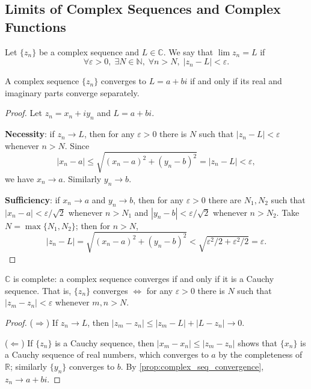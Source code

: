 \subsection{Limits of Complex Sequences and Complex Functions}

\begin{definition}\label{def:complex_seq_limit}
Let $\{z_n\}$ be a complex sequence and $L \in \mathbb{C}$. We say that $\lim z_n = L$ if
\[
\forall \varepsilon > 0,\; \exists N \in \mathbb{N},\; \forall n > N,\; |z_n - L| < \varepsilon.
\]
\end{definition}

\begin{proposition}\label{prop:complex_seq_convergence}
A complex sequence $\{z_n\}$ converges to $L = a+bi$ if and only if its real and imaginary parts converge separately.
\end{proposition}

\begin{proof}
Let $z_n = x_n + iy_n$ and $L = a + bi$.

\textbf{Necessity}: if $z_n \to L$, then for any $\varepsilon > 0$ there is $N$ such that $|z_n - L| < \varepsilon$ whenever $n > N$. Since
\[
|x_n - a| \le \sqrt{(x_n-a)^2 + (y_n-b)^2} = |z_n - L| < \varepsilon,
\]
we have $x_n \to a$. Similarly $y_n \to b$.

\textbf{Sufficiency}: if $x_n \to a$ and $y_n \to b$, then for any $\varepsilon > 0$ there are $N_1, N_2$ such that $|x_n - a| < \varepsilon/\sqrt{2}$ whenever $n > N_1$ and $|y_n - b| < \varepsilon/\sqrt{2}$ whenever $n > N_2$. Take $N = \max\{N_1, N_2\}$; then for $n > N$,
\[
|z_n - L| = \sqrt{(x_n-a)^2 + (y_n-b)^2} < \sqrt{\varepsilon^2/2 + \varepsilon^2/2} = \varepsilon.
\]
\end{proof}

\begin{property}\label{prop:complex_cauchy}
$\mathbb{C}$ is complete: a complex sequence converges if and only if it is a Cauchy sequence. That is, $\{z_n\}$ converges $\iff$ for any $\varepsilon > 0$ there is $N$ such that $|z_m - z_n| < \varepsilon$ whenever $m, n > N$.
\end{property}

\begin{proof}
($\Rightarrow$) If $z_n \to L$, then $|z_m - z_n| \le |z_m - L| + |L - z_n| \to 0$.

($\Leftarrow$) If $\{z_n\}$ is a Cauchy sequence, then $|x_m - x_n| \le |z_m - z_n|$ shows that $\{x_n\}$ is a Cauchy sequence of real numbers, which converges to $a$ by the completeness of $\mathbb{R}$; similarly $\{y_n\}$ converges to $b$. By \cref{prop:complex_seq_convergence}, $z_n \to a+bi$.
\end{proof}

